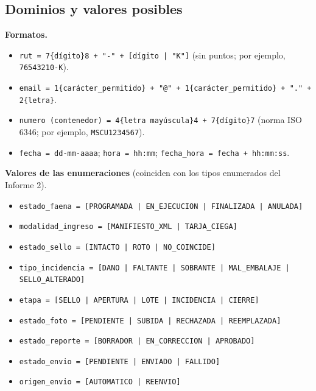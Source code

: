 \subsection{Dominios y valores posibles}

\textbf{Formatos.}
\begin{itemize}
    \item \texttt{rut = 7\{dígito\}8 + "-" + [dígito | "K"]} (sin puntos; por ejemplo,
    \texttt{76543210-K}).
    \item \texttt{email = 1\{carácter\_permitido\} + "@" + 1\{carácter\_permitido\} + "." +
    2\{letra\}}.
    \item \texttt{numero (contenedor) = 4\{letra mayúscula\}4 + 7\{dígito\}7} (norma ISO
    6346; por ejemplo, \texttt{MSCU1234567}).
    \item \texttt{fecha = dd-mm-aaaa}; \texttt{hora = hh:mm}; \texttt{fecha\_hora = fecha +
    hh:mm:ss}.
\end{itemize}

\textbf{Valores de las enumeraciones} (coinciden con los tipos enumerados del Informe 2).
\begin{itemize}
    \item \texttt{estado\_faena = [PROGRAMADA | EN\_EJECUCION | FINALIZADA | ANULADA]}
    \item \texttt{modalidad\_ingreso = [MANIFIESTO\_XML | TARJA\_CIEGA]}
    \item \texttt{estado\_sello = [INTACTO | ROTO | NO\_COINCIDE]}
    \item \texttt{tipo\_incidencia = [DANO | FALTANTE | SOBRANTE | MAL\_EMBALAJE |
    SELLO\_ALTERADO]}
    \item \texttt{etapa = [SELLO | APERTURA | LOTE | INCIDENCIA | CIERRE]}
    \item \texttt{estado\_foto = [PENDIENTE | SUBIDA | RECHAZADA | REEMPLAZADA]}
    \item \texttt{estado\_reporte = [BORRADOR | EN\_CORRECCION | APROBADO]}
    \item \texttt{estado\_envio = [PENDIENTE | ENVIADO | FALLIDO]}
    \item \texttt{origen\_envio = [AUTOMATICO | REENVIO]}
\end{itemize}
